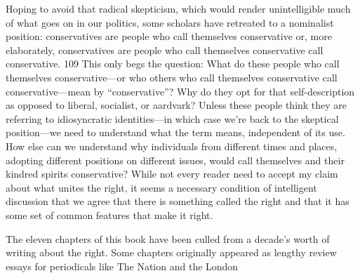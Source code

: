  \par 
Hoping to avoid that radical skepticism, which would render unintelligible much of what goes on in our politics, some scholars have retreated to a nominalist position: conservatives are people who call themselves conservative or, more elaborately, conservatives are people who call themselves conservative call conservative. {\color{blue}109} This only begs the question: What do these people who call themselves conservative—or who others who call themselves conservative call conservative—mean by “conservative”? Why do they opt for that self-description as opposed to liberal, socialist, or aardvark? Unless these people think they are referring to idiosyncratic identities—in which case we’re back to the skeptical position—we need to understand what the term means, independent of its use. How else can we understand why individuals from different times and places, adopting different positions on different issues, would call themselves and their kindred spirits conservative? While not every reader need to accept my claim about what unites the right, it seems a necessary condition of intelligent discussion that we agree that there is something called the right and that it has some set of common features that make it right.
 \par 
The eleven chapters of this book have been culled from a decade’s worth of writing about the right. Some chapters originally appeared as lengthy review essays for periodicals like The Nation and the London
 \par 
